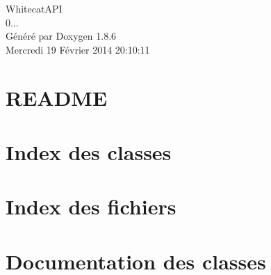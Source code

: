 \documentclass[twoside]{book}
\newcommand{\clearemptydoublepage}{%
  \newpage{\pagestyle{empty}\cleardoublepage}%
}
\begin{document}
\hypersetup{pageanchor=false}
\begin{titlepage}
\vspace*{7cm}
\begin{center}%
{\Large Whitecat\-A\-P\-I \\[1ex]\large 0... }\\
\vspace*{1cm}
{\large Généré par Doxygen 1.8.6}\\
\vspace*{0.5cm}
{\small Mercredi 19 Février 2014 20:10:11}\\
\end{center}
\end{titlepage}
\clearemptydoublepage
\tableofcontents
\clearemptydoublepage
{}
\hypersetup{pageanchor=true}

\chapter{R\-E\-A\-D\-M\-E}
\label{md__r_e_a_d_m_e}
\hypertarget{md__r_e_a_d_m_e}{}

\chapter{Index des classes}

\chapter{Index des fichiers}

\chapter{Documentation des classes}





\end{document}
